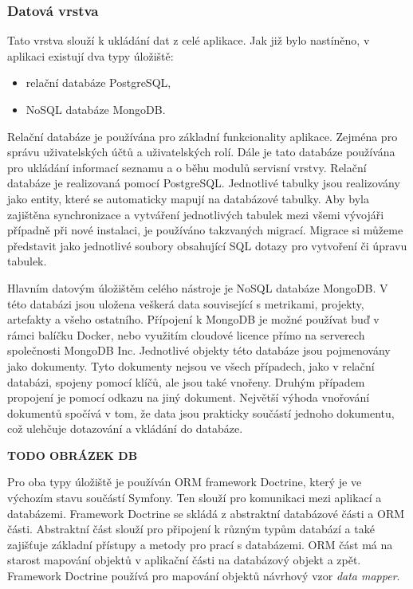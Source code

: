 \documentclass[czech,master,public,dept460,male,cpdeclaration,oneside]{diploma}
\begin{document}
\subsubsection{Datová vrstva}
Tato vrstva slouží k ukládání dat z celé aplikace. Jak již bylo nastíněno, v aplikaci existují dva typy úložiště:

\begin{itemize}
\item relační databáze PostgreSQL,
\item NoSQL databáze MongoDB.
\end{itemize}

Relační databáze je používána pro základní funkcionality aplikace. Zejména pro správu uživatelských účtů a uživatelských rolí. Dále je tato databáze používána pro ukládání informací seznamu a o běhu modulů servisní vrstvy. Relační databáze je realizovaná pomocí PostgreSQL. Jednotlivé tabulky jsou realizovány jako entity, které se automaticky mapují na databázové tabulky. Aby byla zajištěna synchronizace a vytváření jednotlivých tabulek mezi všemi vývojáři případně při nové instalaci, je používáno takzvaných migrací. Migrace si můžeme představit jako jednotlivé soubory obsahující SQL dotazy pro vytvoření či úpravu tabulek.

Hlavním datovým úložištěm celého nástroje je NoSQL databáze MongoDB. V této databázi jsou uložena veškerá data související s metrikami, projekty, artefakty a všeho ostatního. Přípojení k MongoDB je možné používat buď v rámci balíčku Docker, nebo využitím cloudové licence přímo na serverech společnosti MongoDB Inc. Jednotlivé objekty této databáze jsou pojmenovány jako dokumenty. Tyto dokumenty nejsou ve všech případech, jako v relační databázi, spojeny pomocí klíčů, ale jsou také vnořeny. Druhým případem propojení je pomocí odkazu na jiný dokument. Největší výhoda vnořování dokumentů spočívá v tom, že data jsou prakticky součástí jednoho dokumentu, což ulehčuje dotazování a vkládání do databáze. 


\textbf{TODO OBRÁZEK DB}

Pro oba typy úložiště je používán ORM framework Doctrine, který je ve výchozím stavu součástí Symfony. Ten slouží pro komunikaci mezi aplikací a databázemi. Framework Doctrine se skládá z abstraktní databázové části  a ORM části. Abstraktní část slouží pro připojení k různým typům databází a také zajišťuje základní přístupy a metody pro prací s databázemi. ORM část má na starost mapování objektů v aplikační části na databázový objekt a zpět. Framework Doctrine používá pro mapování objektů návrhový vzor \textit{data mapper}.
\end{document}
